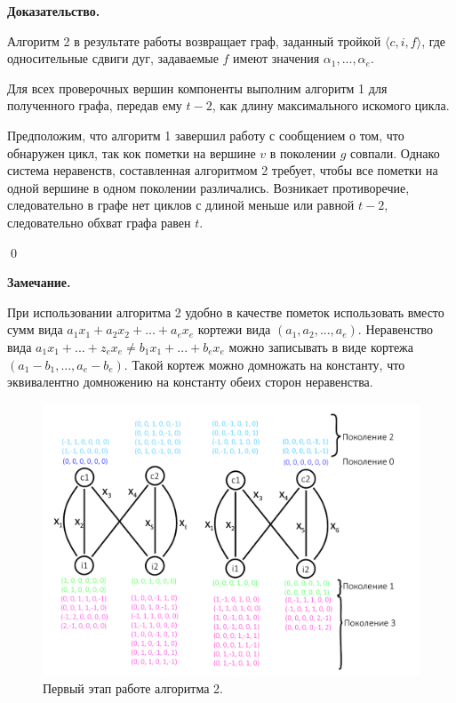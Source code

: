 \documentclass[14pt]{mmcs-article}
\begin{document}
\textbf{Доказательство.}

Алгоритм 2 в результате работы возвращает граф, заданный тройкой $\langle c, i, f \rangle$, где односительные сдвиги дуг, задаваемые $f$ имеют значения $\alpha_1, ..., \alpha_e$.

Для всех проверочных вершин компоненты выполним алгоритм 1 для полученного графа, передав ему $t - 2$, как длину максимального искомого цикла. 

Предположим, что алгоритм 1 завершил работу с сообщением о том, что обнаружен цикл, так кок пометки на вершине $v$ в поколении $g$ совпали. Однако система неравенств, составленная алгоритмом 2 требует, чтобы все пометки на одной вершине в одном поколении различались. Возникает противоречие, следовательно в графе нет циклов с длиной меньше или равной $t - 2$, следовательно обхват графа равен $t$.

\qed

\textbf{Замечание.}

При использовании алгоритма 2 удобно в качестве пометок использовать вместо сумм вида $a_1 x_1 + a_2 x_2 + ... + a_e x_e$ кортежи вида $(a_1, a_2, ..., a_e)$. Неравенство вида $a_1 x_1 + ... + z_e x_e \neq b_1 x_1 + ... + b_e x_e$ можно записывать в виде кортежа $(a_1 - b_1, ..., a_e - b_e)$. Такой кортеж можно домножать на константу, что эквивалентно домножению на константу обеих сторон неравенства. 

\begin{figure}[H]
  \centering
  \includegraphics[scale=0.5]{Fig_6.png}
  \caption{ Первый этап работе алгоритма 2. }
  \label{image:6}
\end{figure}
\end{document}
